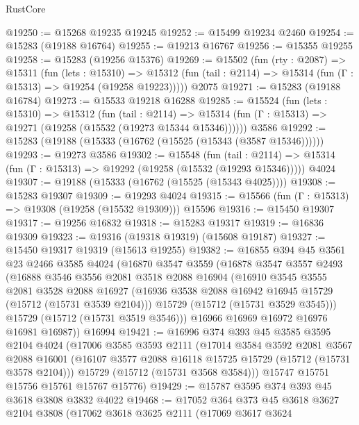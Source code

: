 \begin{lexlean}{RustCore}
\begin{coremodule}
@19250 := @15268 @19235 @19245
@19252 := @15499 @19234 @2460
@19254 := @15283 (@19188 @16764)
@19255 := @19213 @16767
@19256 := @15355 @19255
@19258 := @15283 (@19256 @15376)
@19269 := @15502
    (fun (rty : @2087) =>
    @15311
      (fun (lets : @15310) =>
      @15312 (fun (tail : @2114) => @15314 (fun (Γ : @15313) => @19254 (@19258 @19223)))))
    @2075
@19271 := @15283 (@19188 @16784)
@19273 := @15533 @19218 @16288
@19285 := @15524
    (fun (lets : @15310) =>
    @15312
      (fun (tail : @2114) =>
      @15314 (fun (Γ : @15313) => @19271 (@19258 (@15532 (@19273 @15344 @15346))))))
    @3586
@19292 := @15283 (@19188 (@15333 (@16762 (@15525 (@15343 (@3587 @15346))))))
@19293 := @19273 @3586
@19302 := @15548
    (fun (tail : @2114) => @15314 (fun (Γ : @15313) => @19292 (@19258 (@15532 (@19293 @15346)))))
    @4024
@19307 := @19188 (@15333 (@16762 (@15525 (@15343 @4025))))
@19308 := @15283 @19307
@19309 := @19293 @4024
@19315 := @15566 (fun (Γ : @15313) => @19308 (@19258 (@15532 @19309))) @15596
@19316 := @15450 @19307
@19317 := @19256 @16832
@19318 := @15283 @19317
@19319 := @16836 @19309
@19323 := @19316 (@19318 @19319) (@15608 @19187)
@19327 := @15450 @19317 @19319 (@15613 @19255)
@19382 := @16855
    @394
    @45
    @3561
    @23
    @2466
    @3585
    @4024
    (@16870
      @3547
      @3559
      (@16878
        @3547
        @3557
        @2493
        (@16888
          @3546
          @3556
          @2081
          @3518
          @2088
          @16904
          (@16910
            @3545
            @3555
            @2081
            @3528
            @2088
            @16927
            (@16936 @3538 @2088 @16942 @16945 @15729 (@15712 (@15731 @3539 @2104)))
            @15729
            (@15712 (@15731 @3529 @3545)))
          @15729
          (@15712 (@15731 @3519 @3546)))
        @16966
        @16969
        @16972
        @16976
        @16981
        @16987))
    @16994
@19421 := @16996
    @374
    @393
    @45
    @3585
    @3595
    @2104
    @4024
    (@17006
      @3585
      @3593
      @2111
      (@17014
        @3584
        @3592
        @2081
        @3567
        @2088
        @16001
        (@16107 @3577 @2088 @16118 @15725 @15729 (@15712 (@15731 @3578 @2104)))
        @15729
        (@15712 (@15731 @3568 @3584)))
      @15747
      @15751
      @15756
      @15761
      @15767
      @15776)
@19429 := @15787 @3595 @374 @393 @45 @3618 @3808 @3832 @4022
@19468 := @17052
    @364
    @373
    @45
    @3618
    @3627
    @2104
    @3808
    (@17062
      @3618
      @3625
      @2111
      (@17069
        @3617
        @3624

\end{coremodule}
\end{lexlean}
